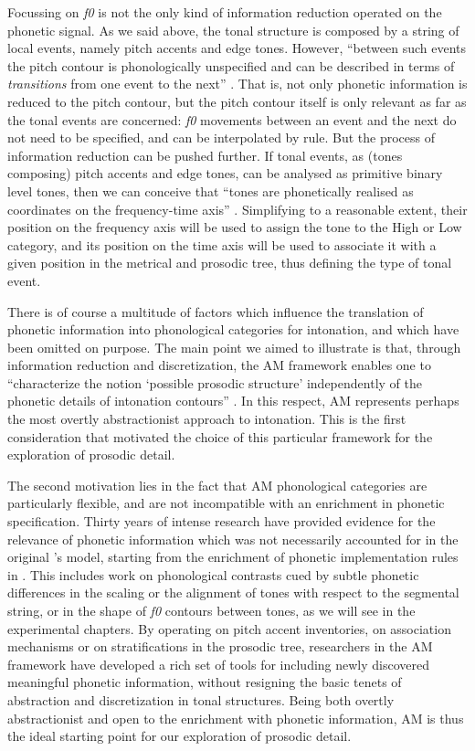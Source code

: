 Focussing on \textit{f0} is not the only kind of information reduction operated on the phonetic signal. As we said above, the tonal structure is composed by a string of local events, namely pitch accents and edge tones. However, ``between such events the pitch contour is phonologically unspecified and can be described in terms of \textit{transitions} from one event to the next'' \cite[44]{ladd2008intonational}. That is, not only phonetic information is reduced to the pitch contour, but the pitch contour itself is only relevant as far as the tonal events are concerned: \textit{f0} movements between an event and the next do not need to be specified, and can be interpolated by rule. But the process of information reduction can be pushed further. If tonal events, as (tones composing) pitch accents and edge tones, can be analysed as primitive binary level tones, then we can conceive that ``tones are phonetically realised as coordinates on the frequency-time axis'' \citep{grice2005german}. Simplifying to a reasonable extent, their position on the frequency axis will be used to assign the tone to the High or Low category, and its position on the time axis will be used to associate it with a given position in the metrical and prosodic tree, thus defining the type of tonal event.

There is of course a multitude of factors which influence the translation of phonetic information into phonological categories for intonation, and which have been omitted on purpose. The main point we aimed to illustrate is that, through information reduction and discretization, the AM framework enables one to ``characterize the notion `possible prosodic structure' independently of the phonetic details of intonation contours'' \cite[123]{gussenhoven2004phonology}. In this respect, AM represents perhaps the most overtly abstractionist approach to intonation. This is the first consideration that motivated the choice of this particular framework for the exploration of prosodic detail. 

The second motivation lies in the fact that AM phonological categories are particularly flexible, and are not incompatible with an enrichment in phonetic specification. Thirty years of intense research have provided evidence for the relevance of phonetic information which was not necessarily accounted for in the original \citeauthor{pierrehumbert1980phonology}'s \citeyear{pierrehumbert1980phonology} model, starting from the enrichment of phonetic implementation rules in \citet{pierrehumbert1988japanese}. This includes work on phonological contrasts cued by subtle phonetic differences in the scaling or the alignment of tones with respect to the segmental string, or in the shape of \textit{f0} contours between tones, as we will see in the experimental chapters. By operating on pitch accent inventories, on association mechanisms or on stratifications in the prosodic tree, researchers in the AM framework have developed a rich set of tools for including newly discovered meaningful phonetic information, without resigning the basic tenets of abstraction and discretization in tonal structures. Being both overtly abstractionist and open to the enrichment with phonetic information, AM is thus the ideal starting point for our exploration of prosodic detail.

